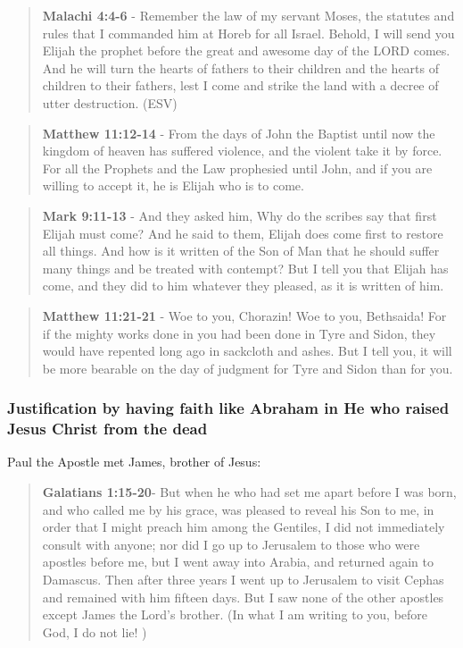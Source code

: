\documentclass[11pt]{article}
\begin{document}
\begin{quote}
\textbf{Malachi 4:4-6} - Remember the law of my servant Moses, the statutes and rules that I commanded him at Horeb for all Israel. Behold, I will send you Elijah the prophet before the great and awesome day of the LORD comes. And he will turn the hearts of fathers to their children and the hearts of children to their fathers, lest I come and strike the land with a decree of utter destruction. (ESV)
\end{quote}

\begin{quote}
\textbf{Matthew 11:12-14} - From the days of John the Baptist until now the kingdom of heaven has suffered violence, and the violent take it by force. For all the Prophets and the Law prophesied until John, and if you are willing to accept it, he is Elijah who is to come.
\end{quote}

\begin{quote}
\textbf{Mark 9:11-13} - And they asked him, Why do the scribes say that first Elijah must come? And he said to them, Elijah does come first to restore all things. And how is it written of the Son of Man that he should suffer many things and be treated with contempt? But I tell you that Elijah has come, and they did to him whatever they pleased, as it is written of him.
\end{quote}

\begin{quote}
\textbf{Matthew 11:21-21} - Woe to you, Chorazin! Woe to you, Bethsaida! For if the mighty works done in you had been done in Tyre and Sidon, they would have repented long ago in sackcloth and ashes. But I tell you, it will be more bearable on the day of judgment for Tyre and Sidon than for you.
\end{quote}

\subsubsection{Justification by having faith like Abraham in He who raised Jesus Christ from the dead}
\label{sec:orgcda7985}
Paul the Apostle met James, brother of Jesus:

\begin{quote}
\textbf{Galatians 1:15-20}- But when he who had set me apart before I was born, and who called me by his grace, was pleased to reveal his Son to me, in order that I might preach him among the Gentiles, I did not immediately consult with anyone; nor did I go up to Jerusalem to those who were apostles before me, but I went away into Arabia, and returned again to Damascus. Then after three years I went up to Jerusalem to visit Cephas and remained with him fifteen days. But I saw none of the other apostles except James the Lord's brother. (In what I am writing to you, before God, I do not lie! )
\end{quote}
\end{document}
